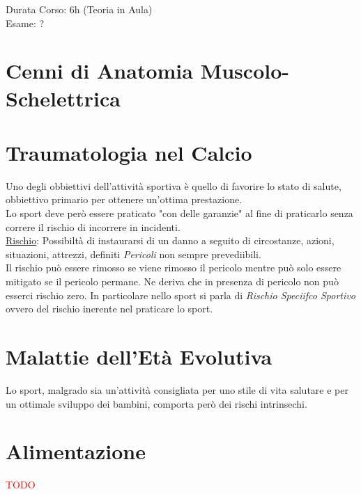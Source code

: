 \documentclass[../uefaC.tex]{subfiles}
\begin{document}

Durata Corso: 6h (Teoria in Aula) \hfill \\
Esame: ?

\section{Cenni di Anatomia Muscolo-Schelettrica}

\section{Traumatologia nel Calcio}

Uno degli obbiettivi dell'attività sportiva è quello di favorire lo stato di salute, obbiettivo primario per ottenere un'ottima prestazione. \hfill \\
Lo sport deve però essere praticato "con delle garanzie" al fine di praticarlo senza correre il rischio di incorrere in incidenti. \hfill \\
\underline{Rischio}: Possibiltà di instaurarsi di un danno a seguito di circostanze, azioni, situazioni, attrezzi, definiti \emph{Pericoli} non sempre prevediibili. \hfill \\
Il rischio può essere rimosso se viene rimosso il pericolo mentre può solo essere mitigato se il pericolo permane. Ne deriva che in presenza di pericolo non può esserci rischio zero. In particolare nello sport si parla di \emph{Rischio Speciifco Sportivo} ovvero del rischio inerente nel praticare lo sport.


\section{Malattie dell'Età Evolutiva}

Lo sport, malgrado sia un'attività consigliata per uno stile di vita salutare e per un ottimale sviluppo dei bambini, comporta però dei rischi intrinsechi.

\section{Alimentazione}

\textcolor{red}{TODO}
\end{document}
